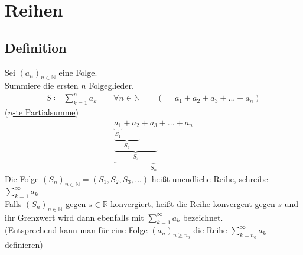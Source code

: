 \documentclass[12pt, titlepage]{article}
\newcommand{\R}{\mathds{R}}
\newcommand{\N}{\mathds{N}}
\renewcommand{\*}{\cdot}
\begin{document}
	\section{Reihen}
	\subsection{Definition}
	Sei $(a_n)_{n\in\N}$ eine Folge.\\
	Summiere die ersten $n$ Folgeglieder.
	\begin{align*}
		S\coloneqq\sum_{k=1}^{n}a_k\qquad\forall
		 n\in\N\qquad (=a_1+a_2+a_3+...+a_n)
	\end{align*}
	(\underline{$n$-te Partialsumme})
	\begin{align*}
		\underbrace{\underbrace{\underbrace{\underbrace{a_1}_{S_1}+a_2}_{S_2}+a_3}_{S_3}+...+a_n}_{S_n}
	\end{align*}
	Die Folge $(S_n)_{n\in\N}=(S_1,S_2,S_3,...)$ heißt \underline{unendliche Reihe}, schreibe $\sum_{k=1}^{\infty}a_k$\\
	Falls $(S_n)_{n\in\N}$ gegen $s\in\R$ konvergiert, heißt die Reihe \underline{konvergent gegen $s$} und ihr Grenzwert wird dann ebenfalls mit $\sum_{k=1}^{\infty}a_k$ bezeichnet.\\
	(Entsprechend kann man für eine Folge $(a_n)_{n\geq n_0}$ die Reihe $\sum_{k=n_0}^{\infty}a_k$ definieren)
\end{document}
